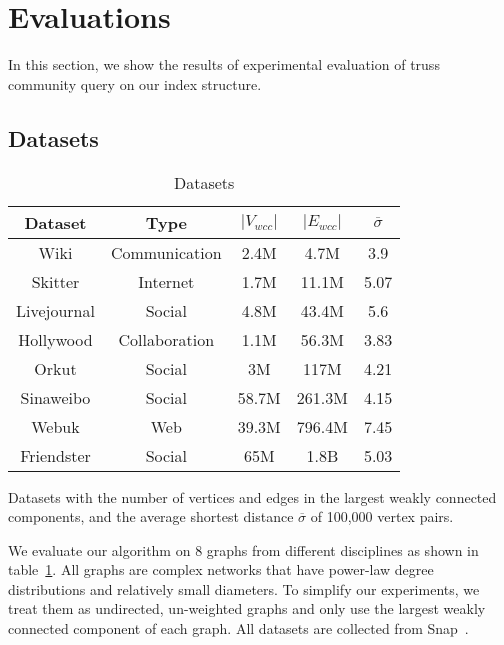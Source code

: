 \section{Evaluations}
\label{evaluation}

In this section, we show the results of experimental evaluation of truss community query on our index structure.

\subsection{Datasets}
\label{eval_datasets}

\begin{table}
		\caption{Datasets}
		\vspace{2 mm}
		\label{table:datasets}
		\begin{threeparttable}
			\centering
			\begin{tabular}{c|cccc} \hline
				Dataset & Type & $|V_{wcc}|$ & $|E_{wcc}|$ & $\overline{\sigma}$ \\ \hline
				Wiki & Communication & 2.4M & 4.7M & 3.9 \\ 
				Skitter & Internet & 1.7M & 11.1M & 5.07 \\ 
				Livejournal & Social & 4.8M & 43.4M & 5.6 \\ 
				Hollywood & Collaboration & 1.1M & 56.3M & 3.83 \\ 
				Orkut & Social & 3M & 117M & 4.21 \\ 
				Sinaweibo & Social & 58.7M & 261.3M & 4.15 \\ 
				Webuk & Web & 39.3M & 796.4M & 7.45 \\ 
				Friendster & Social & 65M & 1.8B & 5.03 \\ \hline
			\end{tabular}
			\begin{tablenotes}
				\item Datasets with the number of vertices and edges in the largest weakly connected components, and the average shortest distance $\overline{\sigma}$ of 100,000 vertex pairs.
			\end{tablenotes}
		\end{threeparttable}
\end{table}

We evaluate our algorithm on 8 graphs from different disciplines as shown in table~\ref{table:datasets}. All graphs are complex networks that have power-law degree distributions and relatively small diameters. To simplify our experiments, we treat them as undirected, un-weighted graphs and only use the largest weakly connected component of each graph. All datasets are collected from Snap~\cite{snapnets}.

